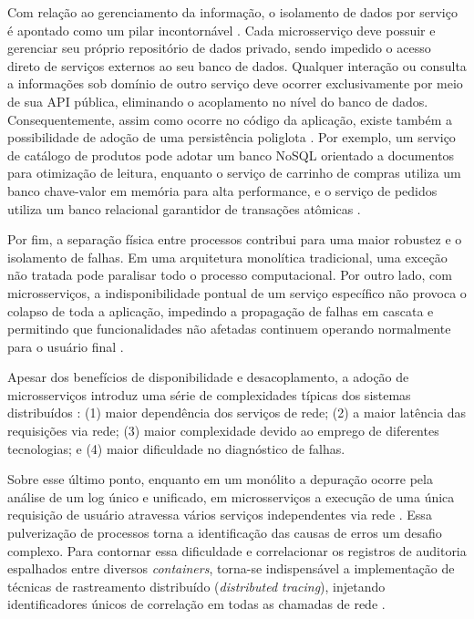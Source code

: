 Com relação ao gerenciamento da informação, o isolamento de dados por serviço é apontado como um pilar incontornável \cite{lewis2014}. Cada microsserviço deve possuir e gerenciar seu próprio repositório de dados privado, sendo impedido o acesso direto de serviços externos ao seu banco de dados. Qualquer interação ou consulta a informações sob domínio de outro serviço deve ocorrer exclusivamente por meio de sua API pública, eliminando o acoplamento no nível do banco de dados. Consequentemente, assim como ocorre no código da aplicação, existe também a possibilidade de adoção de uma persistência poliglota \cite{richardson2018}. Por exemplo, um serviço de catálogo de produtos pode adotar um banco NoSQL orientado a documentos para otimização de leitura, enquanto o serviço de carrinho de compras utiliza um banco chave-valor em memória para alta performance, e o serviço de pedidos utiliza um banco relacional garantidor de transações atômicas \cite{richardson2018}.

Por fim, a separação física entre processos contribui para uma maior robustez e o isolamento de falhas. Em uma arquitetura monolítica tradicional, uma exceção não tratada pode paralisar todo o processo computacional. Por outro lado, com microsserviços, a indisponibilidade pontual de um serviço específico não provoca o colapso de toda a aplicação, impedindo a propagação de falhas em cascata e permitindo que funcionalidades não afetadas continuem operando normalmente para o usuário final \cite{newman2021}.


Apesar dos benefícios de disponibilidade e desacoplamento, a adoção de microsserviços introduz uma série de complexidades típicas dos sistemas distribuídos \cite{lewis2014, soylemez2022}: (1) maior dependência dos serviços de rede; (2) a maior latência das requisições via rede; (3) maior complexidade devido ao emprego de diferentes tecnologias; e (4) maior dificuldade no diagnóstico de falhas.

Sobre esse último ponto, enquanto em um monólito a depuração ocorre pela análise de um log único e unificado, em microsserviços a execução de uma única requisição de usuário atravessa vários serviços independentes via rede \cite{richardson2018}. Essa pulverização de processos torna a identificação das causas de erros um desafio complexo. Para contornar essa dificuldade e correlacionar os registros de auditoria espalhados entre diversos \textit{containers}, torna-se indispensável a implementação de técnicas de rastreamento distribuído (\textit{distributed tracing}), injetando identificadores únicos de correlação em todas as chamadas de rede \cite{richardson2018}.

